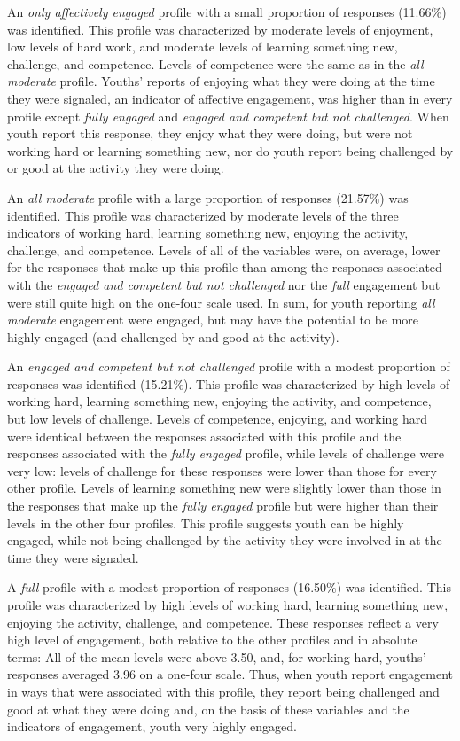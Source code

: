 \documentclass[]{msu-thesis}
\theoremstyle{definition}
\theoremstyle{definition}
\theoremstyle{definition}
\theoremstyle{remark}
\begin{document}
An \emph{only affectively engaged} profile with a small proportion of
responses (11.66\%) was identified. This profile was characterized by
moderate levels of enjoyment, low levels of hard work, and moderate
levels of learning something new, challenge, and competence. Levels of
competence were the same as in the \emph{all moderate} profile. Youths'
reports of enjoying what they were doing at the time they were signaled,
an indicator of affective engagement, was higher than in every profile
except \emph{fully engaged} and \emph{engaged and competent but not
challenged}. When youth report this response, they enjoy what they were
doing, but were not working hard or learning something new, nor do youth
report being challenged by or good at the activity they were doing.

An \emph{all moderate} profile with a large proportion of responses
(21.57\%) was identified. This profile was characterized by moderate
levels of the three indicators of working hard, learning something new,
enjoying the activity, challenge, and competence. Levels of all of the
variables were, on average, lower for the responses that make up this
profile than among the responses associated with the \emph{engaged and
competent but not challenged} nor the \emph{full} engagement but were
still quite high on the one-four scale used. In sum, for youth reporting
\emph{all moderate} engagement were engaged, but may have the potential
to be more highly engaged (and challenged by and good at the activity).

An \emph{engaged and competent but not challenged} profile with a modest
proportion of responses was identified (15.21\%). This profile was
characterized by high levels of working hard, learning something new,
enjoying the activity, and competence, but low levels of challenge.
Levels of competence, enjoying, and working hard were identical between
the responses associated with this profile and the responses associated
with the \emph{fully engaged} profile, while levels of challenge were
very low: levels of challenge for these responses were lower than those
for every other profile. Levels of learning something new were slightly
lower than those in the responses that make up the \emph{fully engaged}
profile but were higher than their levels in the other four profiles.
This profile suggests youth can be highly engaged, while not being
challenged by the activity they were involved in at the time they were
signaled.

A \emph{full} profile with a modest proportion of responses (16.50\%)
was identified. This profile was characterized by high levels of working
hard, learning something new, enjoying the activity, challenge, and
competence. These responses reflect a very high level of engagement,
both relative to the other profiles and in absolute terms: All of the
mean levels were above 3.50, and, for working hard, youths' responses
averaged 3.96 on a one-four scale. Thus, when youth report engagement in
ways that were associated with this profile, they report being
challenged and good at what they were doing and, on the basis of these
variables and the indicators of engagement, youth very highly engaged.
\end{document}
